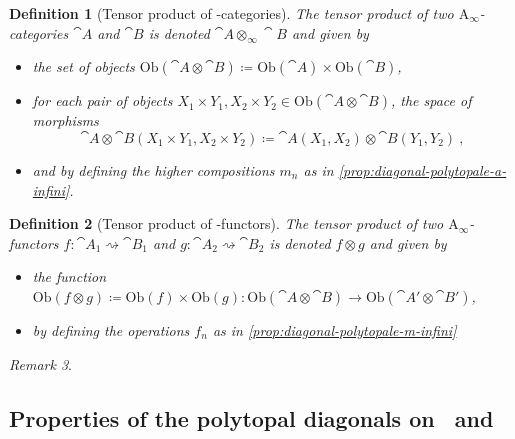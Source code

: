 \documentclass[twoside, 12pt]{amsart}
\newtheorem{definition}{Definition}[section]
\theoremstyle{remark}
\newtheorem{remark}[definition]{\sc Remark}
\begin{document}
\begin{definition}[Tensor product of \Ainf -categories]
The \emph{tensor product} of two $\mathrm{A}_\infty$-categories $\cat{A}$ and $\cat{B}$ is denoted $\cat{A} \otimes_\infty \cat{B}$ and given by 
\begin{itemize}[leftmargin=*]
  \item the set of objects $\mathrm{Ob}(\cat{A}\otimes \cat{B})\coloneqq \mathrm{Ob}(\cat{A})\times\mathrm{Ob}(\cat{B})$,
  \item for each pair of objects $X_1\times Y_1,X_2\times Y_2 \in \mathrm{Ob}(\cat{A}\otimes \cat{B})$, the space of morphisms \[\cat{A}\otimes \cat{B}(X_1\times Y_1,X_2\times Y_2)\coloneqq \cat{A}(X_1,X_2)\otimes\cat{B}(Y_1,Y_2) \ , \]
  \item and by defining the higher compositions $m_n$ as in \cref{prop:diagonal-polytopale-a-infini}.
\end{itemize}
\end{definition}

\begin{definition}[Tensor product of \Ainf -functors]
The \emph{tensor product} of two $\mathrm{A}_\infty$-functors $f:\cat{A}_1 \rightsquigarrow \cat{B}_1$ and $g:\cat{A}_2 \rightsquigarrow \cat{B}_2$ is denoted $f\otimes g$ and given by 
\begin{itemize}[leftmargin=*]
\item the function $\mathrm{Ob}(f\otimes g)\coloneqq \mathrm{Ob}(f)\times \mathrm{Ob}(g) : \mathrm{Ob}(\cat{A}\otimes\cat{B}) \to \mathrm{Ob}(\cat{A}'\otimes\cat{B}')$,
\item by defining the operations $f_n$ as in \cref{prop:diagonal-polytopale-m-infini}
\end{itemize}
\end{definition}

\begin{remark} \label{rem:a-inf-unit}
\end{remark}

\subsection{Properties of the polytopal diagonals on \Ainf\ and \Minf}

\end{document}
